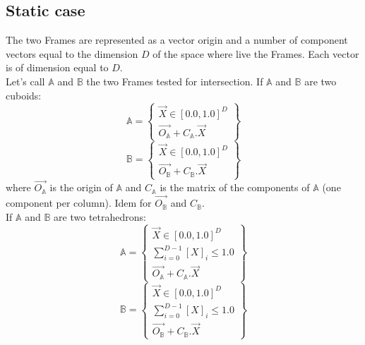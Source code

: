 \documentclass[12pt, a4paper]{article}
\begin{document}
\subsection{Static case}

The two Frames are represented as a vector origin and a number of component vectors equal to the dimension $D$ of the space where live the Frames. Each vector is of dimension equal to $D$.\\

Let's call $\mathbb{A}$ and $\mathbb{B}$ the two Frames tested for intersection. If $\mathbb{A}$ and $\mathbb{B}$ are two cuboids:
\begin{equation}
\mathbb{A}=\left\lbrace
\begin{array}{c}
\overrightarrow{X}\in[0.0,1.0]^D\\
\overrightarrow{O_\mathbb{A}}+C_\mathbb{A}.\overrightarrow{X}
\end{array}
\right\rbrace
\end{equation}
\begin{equation}
\mathbb{B}=\left\lbrace
\begin{array}{c}
\overrightarrow{X}\in[0.0,1.0]^D\\
\overrightarrow{O_\mathbb{B}}+C_\mathbb{B}.\overrightarrow{X}
\end{array}
\right\rbrace
\end{equation}
where $\overrightarrow{O_\mathbb{A}}$ is the origin of $\mathbb{A}$ and $C_\mathbb{A}$ is the matrix of the components of $\mathbb{A}$ (one component per column). Idem for $\overrightarrow{O_\mathbb{B}}$ and $C_\mathbb{B}$.\\

If $\mathbb{A}$ and $\mathbb{B}$ are two tetrahedrons:
\begin{equation}
\mathbb{A}=\left\lbrace
\begin{array}{c}
\overrightarrow{X}\in[0.0,1.0]^D\\
\sum_{i=0}^{D-1}\left[X\right]_i\le1.0\\
\overrightarrow{O_\mathbb{A}}+C_\mathbb{A}.\overrightarrow{X}
\end{array}
\right\rbrace
\end{equation}
\begin{equation}
\mathbb{B}=\left\lbrace
\begin{array}{c}
\overrightarrow{X}\in[0.0,1.0]^D\\
\sum_{i=0}^{D-1}\left[X\right]_i\le1.0\\
\overrightarrow{O_\mathbb{B}}+C_\mathbb{B}.\overrightarrow{X}
\end{array}
\right\rbrace
\end{equation}
\end{document}
